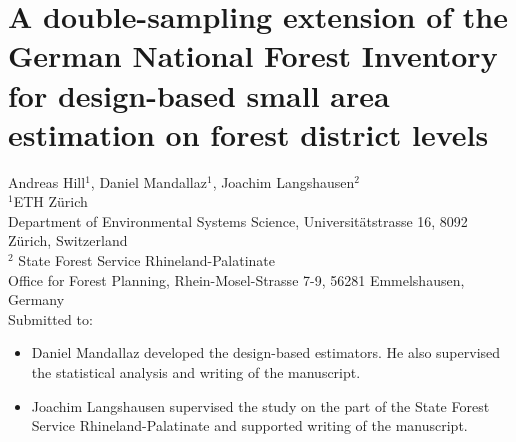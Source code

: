 \chapter{A double-sampling extension of the German National Forest Inventory for design-based small area estimation on forest district levels}
\label{chap:sae}

{\large Andreas Hill$^1$, Daniel Mandallaz$^1$, Joachim Langshausen$^2$}\\

\vspace{3cm}
\noindent
$^1$ETH Z\"urich\\Department of Environmental Systems Science, Universit\"atstrasse 16, 8092 Z\"urich, Switzerland \\
$^2$ State Forest Service Rhineland-Palatinate\\Office for Forest Planning, Rhein-Mosel-Strasse 7-9, 56281 Emmelshausen, Germany \\


\vspace{\fill}
\noindent
Submitted to:\\

\newpage
\thispagestyle{plain}
\renewcommand{\labelitemi}{--}
\begin{itemize}
	\item Daniel Mandallaz developed the design-based estimators. He also supervised the statistical analysis and writing of the manuscript.
	\item Joachim Langshausen supervised the study on the part of the State Forest Service Rhineland-Palatinate and supported writing of the manuscript.
\end{itemize}

\clearpage
